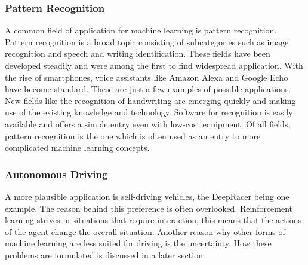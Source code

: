 \subsubsection{Pattern Recognition}
A common field of application for machine learning is pattern recognition. Pattern recognition is a broad topic consisting of subcategories such as image recognition and speech and writing identification. These fields have been developed steadily and were among the first to find widespread application. With the rise of smartphones, voice assistants like Amazon Alexa and Google Echo have become standard. These are just a few examples of possible applications. New fields like the recognition of handwriting are emerging quickly and making use of the existing knowledge and technology. Software for recognition is easily available and offers a simple entry even with low-cost equipment. Of all fields, pattern recognition is the one which is often used as an entry to more complicated machine learning concepts.

\subsubsection{Autonomous Driving}
A more plausible application is self-driving vehicles, the DeepRacer being one example. The reason behind this preference is often overlooked. Reinforcement learning strives in situations that require interaction, this means that the actions of the agent change the overall situation. Another reason why  other forms of machine learning are less suited for driving is the uncertainty. How these problems are formulated is discussed in a later section.

